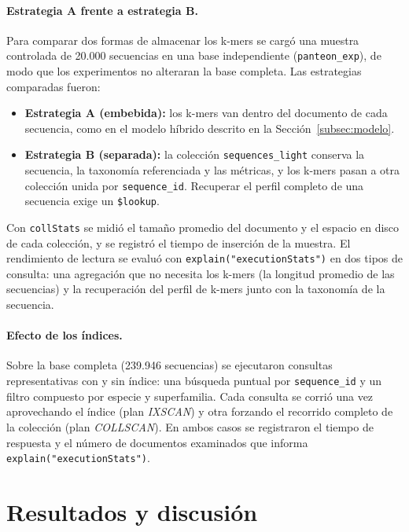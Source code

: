 \documentclass[pdflatex,lineno,referee,sn-vancouver-num]{sn-jnl}
\theoremstyle{thmstyleone}%
\theoremstyle{thmstyletwo}%
\theoremstyle{thmstylethree}%
\begin{document}
\paragraph{Estrategia A frente a estrategia B.} Para comparar dos formas de almacenar los k-mers se cargó una muestra controlada de 20.000 secuencias en una base independiente (\texttt{panteon\_exp}), de modo que los experimentos no alteraran la base completa. Las estrategias comparadas fueron:
\begin{itemize}
  \item \textbf{Estrategia A (embebida):} los k-mers van dentro del documento de cada secuencia, como en el modelo híbrido descrito en la Sección~\ref{subsec:modelo}.
  \item \textbf{Estrategia B (separada):} la colección \texttt{sequences\_light} conserva la secuencia, la taxonomía referenciada y las métricas, y los k-mers pasan a otra colección unida por \texttt{sequence\_id}. Recuperar el perfil completo de una secuencia exige un \texttt{\$lookup}.
\end{itemize}
Con \texttt{collStats} se midió el tamaño promedio del documento y el espacio en disco de cada colección, y se registró el tiempo de inserción de la muestra. El rendimiento de lectura se evaluó con \texttt{explain("executionStats")} en dos tipos de consulta: una agregación que no necesita los k-mers (la longitud promedio de las secuencias) y la recuperación del perfil de k-mers junto con la taxonomía de la secuencia.

\paragraph{Efecto de los índices.} Sobre la base completa (239.946 secuencias) se ejecutaron consultas representativas con y sin índice: una búsqueda puntual por \texttt{sequence\_id} y un filtro compuesto por especie y superfamilia. Cada consulta se corrió una vez aprovechando el índice (plan \textit{IXSCAN}) y otra forzando el recorrido completo de la colección (plan \textit{COLLSCAN}). En ambos casos se registraron el tiempo de respuesta y el número de documentos examinados que informa \texttt{explain("executionStats")}.

\endgroup

\section{Resultados y discusión}\label{sec:resultados}
\end{document}
